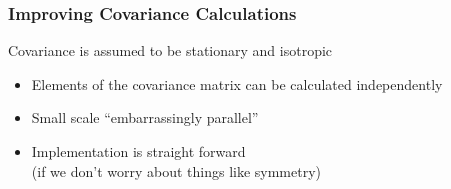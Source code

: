 \documentclass[t]{beamer}\usepackage[]{graphicx}\usepackage[]{color}
\begin{document}
\begin{frame}
\frametitle{Improving Covariance Calculations}
    
Covariance is assumed to be stationary and isotropic
\begin{itemize}
\item Elements of the covariance matrix can be calculated independently
\item Small scale ``embarrassingly parallel''
\item Implementation is straight forward \\ (if we don't worry about things like symmetry)
\end{itemize}

\vfill
\begin{center}
\end{center}
\vfill

\end{frame}

\end{document}
